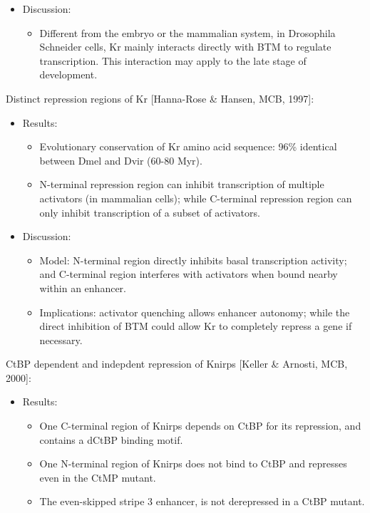 \documentclass{report}
\begin{document}
\begin{enumerate}
\begin{itemize}
		\item Discussion: 
		\begin{itemize}
			\item Different from the embryo or the mammalian system, in Drosophila Schneider cells, Kr mainly interacts directly with BTM to regulate transcription. This interaction may apply to the late stage of development. 
		\end{itemize}
	\end{itemize}
	
	Distinct repression regions of Kr [Hanna-Rose \& Hansen, MCB, 1997]:
	\begin{itemize}
		\item Results: 
		\begin{itemize}
			\item Evolutionary conservation of Kr amino acid sequence: 96\% identical between Dmel and Dvir (60-80 Myr). 
			\item N-terminal repression region can inhibit transcription of multiple activators (in mammalian cells); while C-terminal repression region can only inhibit transcription of a subset of activators. 
		\end{itemize}
		
		\item Discussion: 
		\begin{itemize}
			\item Model: N-terminal region directly inhibits basal transcription activity; and C-terminal region interferes with activators when bound nearby within an enhancer. 
			\item Implications: activator quenching allows enhancer autonomy; while the direct inhibition of BTM could allow Kr to completely repress a gene if necessary. 
		\end{itemize}
	\end{itemize}
	
	CtBP dependent and indepdent repression of Knirps [Keller \& Arnosti, MCB, 2000]:
	\begin{itemize}
		\item Results: 
		\begin{itemize}
			\item One C-terminal region of Knirps depends on CtBP for its repression, and contains a dCtBP binding motif. 
			\item One N-terminal region of Knirps does not bind to CtBP and represses even in the CtMP mutant. 
			\item The even-skipped stripe 3 enhancer, is not derepressed in a CtBP mutant.
		\end{itemize}
		

\end{itemize}
\end{enumerate}
\end{document}

